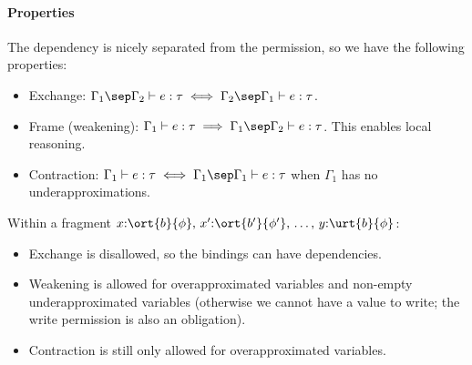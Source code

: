 \paragraph{Properties} The dependency is nicely separated from the permission, so we have the following properties:
\begin{itemize}
    \item Exchange: $\Gamma_1 \sep \Gamma_2 \vdash e : \tau \iff \Gamma_2 \sep \Gamma_1 \vdash e : \tau$.
    \item Frame (weakening): $\Gamma_1 \vdash e : \tau \implies \Gamma_1 \sep \Gamma_2 \vdash e : \tau$. This enables local reasoning.
    \item Contraction: $\Gamma_1 \vdash e : \tau \iff \Gamma_1 \sep \Gamma_1 \vdash e : \tau$ when $\Gamma_1$ has no underapproximations.
\end{itemize}
Within a fragment $x{:}\ort{b}{\phi},\, x'{:}\ort{b'}{\phi'},\, \ldots,\, y{:}\urt{b}{\phi}$:
\begin{itemize}
    \item Exchange is disallowed, so the bindings can have dependencies.
    \item Weakening is allowed for overapproximated variables and non-empty underapproximated variables (otherwise we cannot have a value to write; the write permission is also an obligation).
    \item Contraction is still only allowed for overapproximated variables.
\end{itemize}